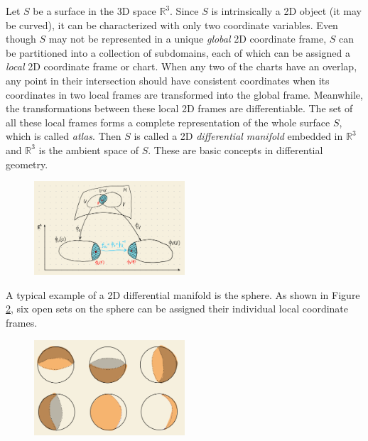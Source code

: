 \documentclass[11pt, a4paper]{book}
\begin{document}
Let $S$ be a surface in the 3D space $\mathbb{R}^3$. Since $S$ is intrinsically a 2D
object (it may be curved), it can be characterized with only two coordinate variables.
Even though $S$ may not be represented in a unique \emph{global} 2D coordinate frame, $S$
can be partitioned into a collection of subdomains, each of which can be assigned a
\emph{local} 2D coordinate frame or chart. When any two of the charts have an overlap, any
point in their intersection should have consistent coordinates when its coordinates in two
local frames are transformed into the global frame. Meanwhile, the transformations between
these local 2D frames are differentiable. The set of all these local frames forms a
complete representation of the whole surface $S$, which is called \emph{atlas}. Then $S$
is called a 2D \emph{differential manifold} embedded in $\mathbb{R}^3$ and $\mathbb{R}^3$
is the ambient space of $S$. These are basic concepts in differential geometry.
\begin{figure}[htbp]
  \centering
  \includegraphics[width=0.5\textwidth, height=\textheight, keepaspectratio]{figures/manifold-draft}
  \caption{}
  \label{fig:differential-manifold}
\end{figure}
A typical example of a 2D differential manifold is the sphere. As shown in Figure
\ref{fig:sphere-manifold}, six open sets on the sphere can be assigned their individual
local coordinate frames.
\begin{figure}[htbp]
  \centering
  \includegraphics[width=0.5\textwidth, height=\textheight, keepaspectratio]{figures/coordinate-chart-for-sphere-draft}
  \caption{}
  \label{fig:sphere-manifold}
\end{figure}
\end{document}
